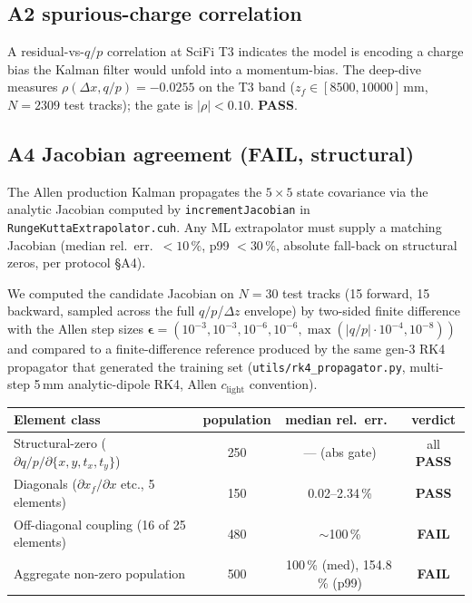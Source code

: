 \documentclass[11pt,a4paper]{article}
\newcommand{\dz}{\ensuremath{\Delta z}}
\newcommand{\qop}{\ensuremath{q/p}}
\newcommand{\PASS}{\textcolor{green!55!black}{\textbf{PASS}}}
\newcommand{\FAIL}{\textcolor{red!70!black}{\textbf{FAIL}}}
\begin{document}
\subsection*{A2 spurious-charge correlation}
A residual-vs-\(\qop\) correlation at SciFi T3 indicates the model is
encoding a charge bias the Kalman filter would unfold into a
momentum-bias. The deep-dive measures
\(\rho(\Delta x, \qop) = -0.0255\) on the T3 band
(\(z_f\in[8500,10000]\)\,mm, \(N=2309\) test tracks); the gate is
\(|\rho|<0.10\). \PASS.

\subsection*{A4 Jacobian agreement (\FAIL, structural)}
\label{sec:a4}
The Allen production Kalman propagates the \(5\times5\) state
covariance via the analytic Jacobian computed by
\texttt{incrementJacobian} in
\texttt{RungeKuttaExtrapolator.cuh}. Any ML extrapolator must supply a
matching Jacobian (median rel.\ err.\ \(<10\,\%\), p99 \(<30\,\%\),
absolute fall-back on structural zeros, per protocol §A4).

We computed the candidate Jacobian on \(N=30\) test tracks (15 forward,
15 backward, sampled across the full \(\qop\)/\(\dz\) envelope) by
two-sided finite difference with the Allen step sizes
\(\boldsymbol{\epsilon}=(10^{-3},10^{-3},10^{-6},10^{-6},
\max(|\qop|\!\cdot\!10^{-4},10^{-8}))\) and compared to a finite-difference
reference produced by the same gen-3 RK4 propagator that generated the
training set (\texttt{utils/rk4\_propagator.py}, multi-step 5\,mm
analytic-dipole RK4, Allen \(c_\text{light}\) convention).

\begin{center}\small
\begin{tabular}{lccc}
\toprule
Element class & population & median rel.\ err.\ & verdict \\
\midrule
Structural-zero (\(\partial\qop/\partial\{x,y,t_x,t_y\}\)) & 250 & --- (abs gate) & all \PASS \\
Diagonals (\(\partial x_f/\partial x\) etc., 5 elements)   & 150 & 0.02--2.34\,\% & \PASS \\
Off-diagonal coupling (16 of 25 elements)                  & 480 & \(\sim\)100\,\%   & \FAIL \\
\midrule
Aggregate non-zero population                              & 500 & 100\,\% (med), 154.8\,\% (p99) & \FAIL \\
\bottomrule
\end{tabular}
\end{center}
\end{document}
